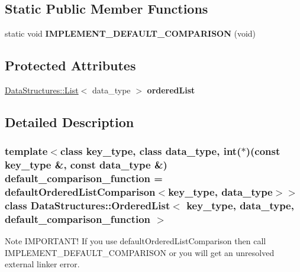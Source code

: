 \subsection*{Static Public Member Functions}
\begin{DoxyCompactItemize}
\item 
\hypertarget{class_data_structures_1_1_ordered_list_a3c38c2e0a64e1ddcf86feb6903303d06}{static void {\bfseries I\-M\-P\-L\-E\-M\-E\-N\-T\-\_\-\-D\-E\-F\-A\-U\-L\-T\-\_\-\-C\-O\-M\-P\-A\-R\-I\-S\-O\-N} (void)}\label{class_data_structures_1_1_ordered_list_a3c38c2e0a64e1ddcf86feb6903303d06}

\end{DoxyCompactItemize}
\subsection*{Protected Attributes}
\begin{DoxyCompactItemize}
\item 
\hypertarget{class_data_structures_1_1_ordered_list_abccd21c52351b495680c3a4fbfbf5207}{\hyperlink{class_data_structures_1_1_list}{Data\-Structures\-::\-List}$<$ data\-\_\-type $>$ {\bfseries ordered\-List}}\label{class_data_structures_1_1_ordered_list_abccd21c52351b495680c3a4fbfbf5207}

\end{DoxyCompactItemize}


\subsection{Detailed Description}
\subsubsection*{template$<$class key\-\_\-type, class data\-\_\-type, int($\ast$)(const key\-\_\-type \&, const data\-\_\-type \&) default\-\_\-comparison\-\_\-function = default\-Ordered\-List\-Comparison$<$key\-\_\-type, data\-\_\-type$>$$>$class Data\-Structures\-::\-Ordered\-List$<$ key\-\_\-type, data\-\_\-type, default\-\_\-comparison\-\_\-function $>$}

\begin{DoxyNote}{Note}
I\-M\-P\-O\-R\-T\-A\-N\-T! If you use default\-Ordered\-List\-Comparison then call I\-M\-P\-L\-E\-M\-E\-N\-T\-\_\-\-D\-E\-F\-A\-U\-L\-T\-\_\-\-C\-O\-M\-P\-A\-R\-I\-S\-O\-N or you will get an unresolved external linker error. 
\end{DoxyNote}


